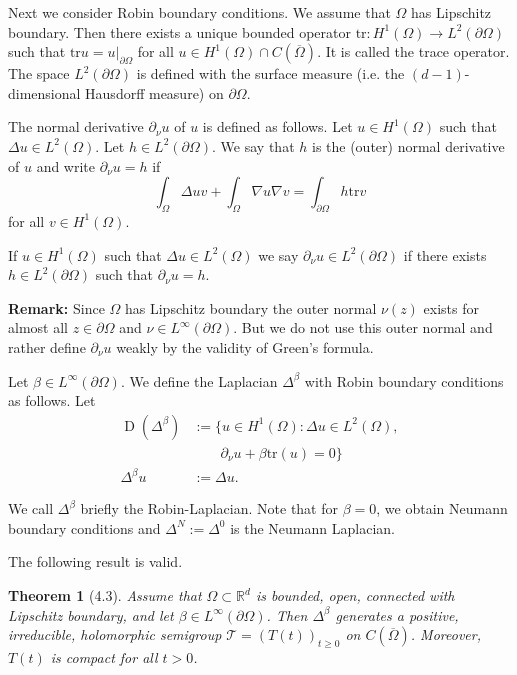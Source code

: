 \documentclass[11pt]{article}
\newtheorem{theorem}{Theorem}[section]
\DeclareMathOperator{\dom}{D}
\begin{document}
Next we consider Robin boundary conditions. We assume that $\Omega$ has Lipschitz boundary. Then there exists a unique bounded operator $\text{tr} : H^1(\Omega) \to L^2(\partial\Omega)$ such that $\text{tr}u = u|_{\partial\Omega}$ for all $u \in H^1(\Omega) \cap C(\overline{\Omega})$. It is called the trace operator. The space $L^2(\partial\Omega)$ is defined with the surface measure (i.e. the $(d-1)$-dimensional Hausdorff measure) on $\partial\Omega$.

The normal derivative $\partial_\nu u$ of $u$ is defined as follows. Let $u \in H^1(\Omega)$ such that $\Delta u \in L^2(\Omega)$. Let $h \in L^2(\partial\Omega)$. We say that $h$ is the (outer) normal derivative of $u$ and write $\partial_\nu u = h$ if
\begin{equation}
\int_\Omega \Delta u v + \int_\Omega \nabla u \nabla v = \int_{\partial\Omega} h \text{tr}v
\end{equation}
for all $v \in H^1(\Omega)$.

If $u \in H^1(\Omega)$ such that $\Delta u \in L^2(\Omega)$ we say $\partial_\nu u \in L^2(\partial\Omega)$ if there exists $h \in L^2(\partial\Omega)$ such that $\partial_\nu u = h$.

\textbf{Remark:} Since $\Omega$ has Lipschitz boundary the outer normal $\nu(z)$ exists for almost all $z \in \partial\Omega$ and $\nu \in L^\infty(\partial\Omega)$. But we do not use this outer normal and rather define $\partial_\nu u$ weakly by the validity of Green's formula.

Let $\beta \in L^\infty(\partial\Omega)$. We define the Laplacian $\Delta^\beta$ with Robin boundary conditions as follows. Let
\begin{align}
\dom(\Delta^\beta) &:= \{u \in H^1(\Omega) : \Delta u \in L^2(\Omega),\\
&\qquad \partial_\nu u + \beta \text{tr}(u) = 0\}\\
\Delta^\beta u &:= \Delta u.
\end{align}

We call $\Delta^\beta$ briefly the Robin-Laplacian. Note that for $\beta = 0$, we obtain Neumann boundary conditions and $\Delta^N := \Delta^0$ is the Neumann Laplacian.

The following result is valid.

\begin{theorem}[4.3]
Assume that $\Omega \subset \mathbb{R}^d$ is bounded, open, connected with Lipschitz boundary, and let $\beta \in L^\infty(\partial\Omega)$. Then $\Delta^\beta$ generates a positive, irreducible, holomorphic semigroup $\mathcal{T} = (T(t))_{t \geq 0}$ on $C(\overline{\Omega})$. Moreover, $T(t)$ is compact for all $t > 0$.
\end{theorem}
\end{document}
